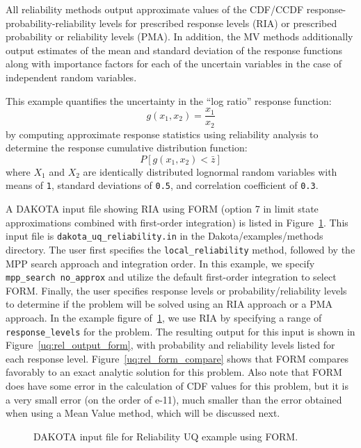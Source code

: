 All reliability methods output approximate values of the CDF/CCDF
response-probability-reliability levels for prescribed response levels
(RIA) or prescribed probability or reliability levels (PMA).  In
addition, the MV methods additionally output estimates of the mean and
standard deviation of the response functions along with importance
factors for each of the uncertain variables in the case of independent
random variables.

This example quantifies the uncertainty in the ``log ratio'' response
function:
\begin{equation}
g(x_1,x_2) = \frac{x_1}{x_2}
\end{equation}
by computing approximate response statistics using reliability
analysis to determine the response cumulative distribution function:
\begin{equation}
P[g(x_1,x_2) < \bar{z}]
\end{equation}
where $X_1$ and $X_2$ are identically distributed lognormal random
variables with means of \texttt{1}, standard deviations of
\texttt{0.5}, and correlation coefficient of \texttt{0.3}.

A DAKOTA input file showing RIA using FORM (option 7 in limit state
approximations combined with first-order integration) is listed in
Figure~\ref{uq:rel_input_form}.  This input file is
\texttt{dakota\_uq\_reliability.in} in the {Dakota/examples/methods}
directory.  The user first specifies the \texttt{local\_reliability}
method, followed by the MPP search approach and integration order.  In
this example, we specify \texttt{mpp\_search no\_approx} and utilize
the default first-order integration to select FORM.  Finally, the user
specifies response levels or probability/reliability levels to
determine if the problem will be solved using an RIA approach or a PMA
approach.  In the example figure of~\ref{uq:rel_input_form}, we use
RIA by specifying a range of \texttt{response\_levels} for the
problem.  The resulting output for this input is shown in
Figure~\ref{uq:rel_output_form}, with probability and reliability
levels listed for each response level.  Figure~\ref{uq:rel_form_compare} 
shows that FORM compares favorably to an exact analytic solution for
this problem.  Also note that FORM does have some error in the
calculation of CDF values for this problem, but it is a very small
error (on the order of e-11), much smaller than the error obtained
when using a Mean Value method, which will be discussed next.
\begin{figure}
  \centering
  \begin{bigbox}
    \begin{small}
    \end{small}
  \end{bigbox}
\caption{DAKOTA input file for Reliability UQ example using FORM.}
\label{uq:rel_input_form}
\end{figure}

